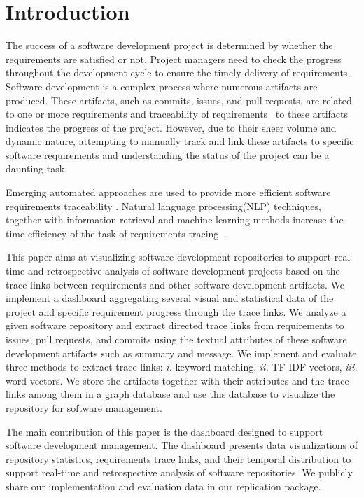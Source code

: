 \section{Introduction}
\label{sec:intro}

The success of a software development project is determined by whether the requirements are satisfied or not. Project managers need to check the progress throughout the development cycle to ensure the timely delivery of requirements. Software development is a complex process where numerous artifacts are produced. These artifacts, such as commits, issues, and pull requests, are related to one or more requirements and traceability of requirements~\cite{gotel-1994} to these artifacts indicates the progress of the project. However, due to their sheer volume and dynamic nature, attempting to manually track and link these artifacts to specific software requirements and understanding the status of the project can be a daunting task.

Emerging automated approaches are used to provide more efficient software requirements traceability \cite{cleland-huang-2007,mills-2017,VANOOSTEN2023107226,bonner-2023,deen-2023}. Natural language processing(NLP) techniques, together with information retrieval and machine learning methods increase the time efficiency of the task of requirements tracing~\cite{cleland-huang-2007}.

This paper aims at visualizing software development repositories to support real-time and retrospective analysis of software development projects based on the trace links between requirements and other software development artifacts. We implement a dashboard aggregating several visual and statistical data of the project and specific requirement progress through the trace links. We analyze a given software repository and extract directed trace links from requirements to issues, pull requests, and commits using the textual attributes of these software development artifacts such as summary and message. We implement and evaluate three methods to extract trace links: \emph{i.} keyword matching, \emph{ii.} TF-IDF vectors, \emph{iii.} word vectors. We store the artifacts together with their attributes and the trace links among them in a graph database and use this database to visualize the repository for software management.

The main contribution of this paper is the dashboard designed to support software development management. The dashboard presents data visualizations of repository statistics, requirements trace links, and their temporal distribution to support real-time and retrospective analysis of software repositories. We publicly share our implementation and evaluation data in our replication package.

